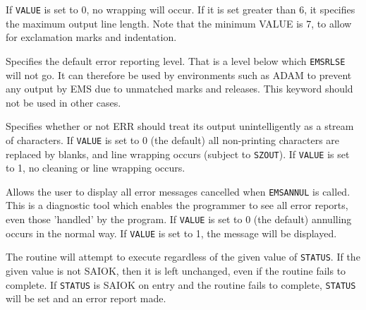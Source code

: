\documentclass[twoside,11pt]{article}
\renewcommand{\_}{\texttt{\symbol{95}}}
\begin{document}
\begin {small}
{{\begin{description}
            If \texttt{VALUE} is set to 0, no wrapping will occur. If it is
            set greater than 6, it specifies the maximum output line length.
            Note that the minimum VALUE is 7, to allow for exclamation marks
            and indentation.
       \item['MSGDEF'] Specifies the default error reporting level. That is a
            level below which \texttt{EMS\_RLSE} will not go. It can therefore
            be used by environments such as ADAM to prevent any output by EMS
            due to unmatched marks and releases. This keyword should not be
            used in other cases.

       \item['STREAM'] Specifies whether or not ERR should treat its output
            unintelligently as a stream of characters.
            If \texttt{VALUE} is set to 0 (the default) all non-printing
            characters are replaced by blanks, and line wrapping occurs
            (subject to \texttt{SZOUT}).
            If \texttt{VALUE} is set to 1, no cleaning or line wrapping occurs.

       \item['REVEAL'] Allows the user to display all error messages cancelled
            when \texttt{EMS\_ANNUL} is called. This is a diagnostic tool which
            enables the programmer to see all error reports, even those
            'handled' by the program. If \texttt{VALUE} is set to 0 (the
            default) annulling occurs in the normal way. If \texttt{VALUE} is
            set to 1, the message will be displayed.
       \end{description}
      The routine will attempt to execute regardless of the given value of
      \texttt{STATUS}. If the given value is not SAI\_\_OK, then it is left
      unchanged, even if the routine fails to complete. If \texttt{STATUS} is
      SAI\_\_OK on entry and the routine fails to complete, \texttt{STATUS}
      will be set and an error report made.

}}
\end{small}
\end{document}
